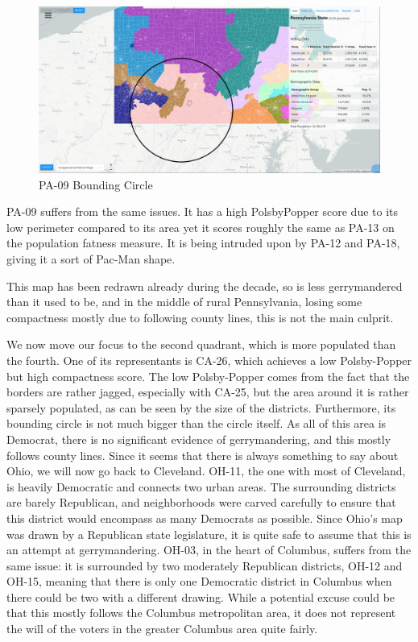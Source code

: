 \documentclass[letterpaper]{article}
\begin{document}
\begin{figure}[H]
	\includegraphics[width=\linewidth]{./figures/PA-09-BoundingCircle.png}
	\caption{PA-09 Bounding Circle}
	\label{fig:pa09boundingCircle}
\end{figure}

PA-09 suffers from the same issues. It has a high PolsbyPopper score due to its low perimeter compared to its area yet it scores roughly the same as PA-13 on the population fatness measure. It is being intruded upon by PA-12 and PA-18, giving it a sort of Pac-Man shape.

This map has been redrawn already during the decade, so is less gerrymandered than it used to be, and in the middle of rural Pennsylvania, losing some compactness mostly due to following county lines, this is not the main culprit. 

We now move our focus to the second quadrant, which is more populated than the fourth. One of its representants is CA-26, which achieves a low Polsby-Popper but high compactness score. The low Polsby-Popper comes from the fact that the borders are rather jagged, especially with CA-25, but the area around it is rather sparsely populated, as can be seen by the size of the districts. Furthermore, its bounding circle is not much bigger than the circle itself. As all of this area is Democrat, there is no significant evidence of gerrymandering, and this mostly follows county lines. Since it seems that there is always something to say about Ohio, we will now go back to Cleveland. OH-11, the one with most of Cleveland, is heavily Democratic and connects two urban areas. The surrounding districts are barely Republican, and neighborhoods were carved carefully to ensure that this district would encompass as many Democrats as possible. Since Ohio’s map was drawn by a Republican state legislature, it is quite safe to assume that this is an attempt at gerrymandering. OH-03, in the heart of Columbus, suffers from the same issue: it is surrounded by two moderately Republican districts, OH-12 and OH-15, meaning that there is only one Democratic district in Columbus when there could be two with a different drawing.  While a potential excuse could be that this mostly follows the Columbus metropolitan area, it does not represent the will of the voters in the greater Columbus area quite fairly. 
\end{document}
